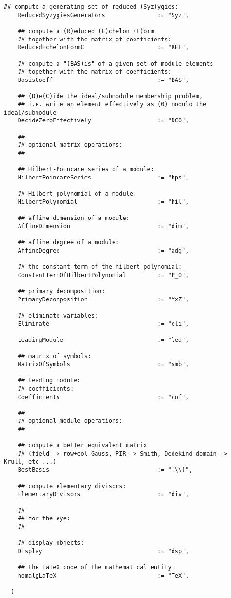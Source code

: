 \documentclass[a4paper,11pt]{report}
\begin{document}
{{{\begin{Verbatim}[fontsize=\small,frame=single,label=Code]
    ## compute a generating set of reduced (Syz)ygies:
    ReducedSyzygiesGenerators               := "Syz",
    
    ## compute a (R)educed (E)chelon (F)orm
    ## together with the matrix of coefficients:
    ReducedEchelonFormC                     := "REF",
    
    ## compute a "(BAS)is" of a given set of module elements
    ## together with the matrix of coefficients:
    BasisCoeff                              := "BAS",
    
    ## (D)e(C)ide the ideal/submodule membership problem,
    ## i.e. write an element effectively as (0) modulo the ideal/submodule:
    DecideZeroEffectively                   := "DC0",
    
    ##
    ## optional matrix operations:
    ##
    
    ## Hilbert-Poincare series of a module:
    HilbertPoincareSeries                   := "hps",
    
    ## Hilbert polynomial of a module:
    HilbertPolynomial                       := "hil",
    
    ## affine dimension of a module:
    AffineDimension                         := "dim",
    
    ## affine degree of a module:
    AffineDegree                            := "adg",
    
    ## the constant term of the hilbert polynomial:
    ConstantTermOfHilbertPolynomial         := "P_0",
    
    ## primary decomposition:
    PrimaryDecomposition                    := "YxZ",
    
    ## eliminate variables:
    Eliminate                               := "eli",
    
    LeadingModule                           := "led",
    
    ## matrix of symbols:
    MatrixOfSymbols                         := "smb",
    
    ## leading module:
    ## coefficients:
    Coefficients                            := "cof",
    
    ##
    ## optional module operations:
    ##
    
    ## compute a better equivalent matrix
    ## (field -> row+col Gauss, PIR -> Smith, Dedekind domain -> Krull, etc ...):
    BestBasis                               := "(\\)",
    
    ## compute elementary divisors:
    ElementaryDivisors                      := "div",
    
    ##
    ## for the eye:
    ##
    
    ## display objects:
    Display                                 := "dsp",
    
    ## the LaTeX code of the mathematical entity:
    homalgLaTeX                             := "TeX",
    
  )
\end{Verbatim}
 }

 }

  }
\end{document}
